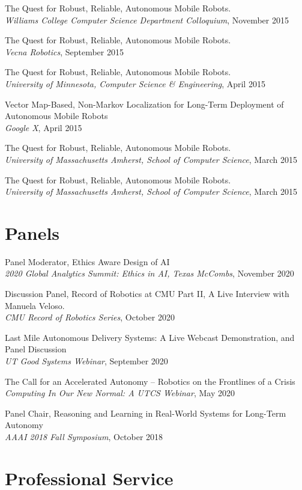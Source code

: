 \documentclass[Times]{article}
\begin{document}
The Quest for Robust, Reliable, Autonomous Mobile Robots.\\
{\em Williams College Computer Science Department Colloquium}, November 2015

The Quest for Robust, Reliable, Autonomous Mobile Robots.\\
{\em Vecna Robotics}, September 2015

The Quest for Robust, Reliable, Autonomous Mobile Robots.\\
{\em University of Minnesota, Computer Science \& Engineering}, April 2015

Vector Map-Based, Non-Markov Localization for Long-Term Deployment of Autonomous Mobile Robots\\
{\em Google X}, April 2015

The Quest for Robust, Reliable, Autonomous Mobile Robots.\\
{\em University of Massachusetts Amherst, School of Computer Science}, March 2015

The Quest for Robust, Reliable, Autonomous Mobile Robots.\\
{\em University of Massachusetts Amherst, School of Computer Science}, March 2015


\section*{Panels}
Panel Moderator, Ethics Aware Design of AI\\
{\em 2020 Global Analytics Summit: Ethics in AI, Texas McCombs}, November 2020

Discussion Panel, Record of Robotics at CMU Part II, A Live Interview with
Manuela Veloso.\\
{\em CMU Record of Robotics Series}, October 2020

Last Mile Autonomous Delivery Systems: A Live Webcast Demonstration, and Panel Discussion\\
{\em UT Good Systems Webinar}, September 2020

The Call for an Accelerated Autonomy -- Robotics on the Frontlines of a Crisis\\
{\em Computing In Our New Normal: A UTCS Webinar}, May 2020

Panel Chair, Reasoning and Learning in Real-World Systems for Long-Term
Autonomy\\
{\em AAAI 2018 Fall Symposium}, October 2018

\section*{Professional Service}
\end{document}
